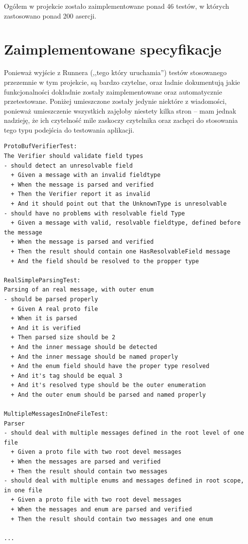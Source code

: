 \documentclass[pdflatex,11pt]{aghdpl}
\begin{document}
Ogółem w projekcie zostało zaimplementowane ponad 46 testów, w których zastosowano ponad 200 asercji.

\section{Zaimplementowane specyfikacje}
Ponieważ wyjście z Runnera (,,tego który uruchamia'') testów stosowanego przezemnie w tym projekcie, są bardzo czytelne, oraz ładnie dokumentują 
jakie funkcjonalności dokładnie zostały zaimplementowane oraz automatycznie przetestowane. Poniżej umieszczone zostały jedynie niektóre z wiadomości,
ponieważ umieszczenie wszystkich zajęłoby niestety kilka stron -- mam jednak nadzieję, że ich czytelność mile zaskoczy czytelnika oraz zachęci do stosowania
tego typu podejścia do testowania aplikacji.

\begin{verbatim}
ProtoBufVerifierTest:
The Verifier should validate field types 
- should detect an unresolvable field
  + Given a message with an invalid fieldtype 
  + When the message is parsed and verified 
  + Then the Verifier report it as invalid 
  + And it should point out that the UnknownType is unresolvable 
- should have no problems with resolvable field Type
  + Given a message with valid, resolvable fieldtype, defined before the message 
  + When the message is parsed and verified 
  + Then the result should contain one HasResolvableField message 
  + And the field should be resolved to the propper type 

RealSimpleParsingTest:
Parsing of an real message, with outer enum 
- should be parsed properly
  + Given A real proto file 
  + When it is parsed 
  + And it is verified 
  + Then parsed size should be 2 
  + And the inner message should be detected 
  + And the inner message should be named properly 
  + And the enum field should have the proper type resolved 
  + And it's tag should be equal 3 
  + And it's resolved type should be the outer enumeration 
  + And the outer enum should be parsed and named properly 

MultipleMessagesInOneFileTest:
Parser 
- should deal with multiple messages defined in the root level of one file
  + Given a proto file with two root devel messages 
  + When the messages are parsed and verified 
  + Then the result should contain two messages 
- should deal with multiple enums and messages defined in root scope, in one file
  + Given a proto file with two root devel messages 
  + When the messages and enum are parsed and verified 
  + Then the result should contain two messages and one enum 

...
\end{verbatim}
\end{document}
